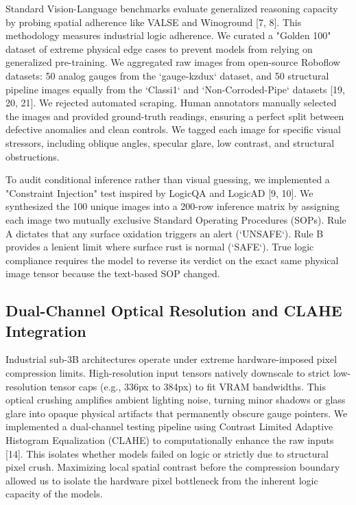 \documentclass{article}
\begin{document}
Standard Vision-Language benchmarks evaluate generalized reasoning capacity by probing spatial adherence like VALSE and Winoground [7, 8]. This methodology measures industrial logic adherence. We curated a "Golden 100" dataset of extreme physical edge cases to prevent models from relying on generalized pre-training. We aggregated raw images from open-source Roboflow datasets: 50 analog gauges from the `gauge-kzdux` dataset, and 50 structural pipeline images equally from the `Classi1` and `Non-Corroded-Pipe` datasets [19, 20, 21]. We rejected automated scraping. Human annotators manually selected the images and provided ground-truth readings, ensuring a perfect split between defective anomalies and clean controls. We tagged each image for specific visual stressors, including oblique angles, specular glare, low contrast, and structural obstructions.

To audit conditional inference rather than visual guessing, we implemented a "Constraint Injection" test inspired by LogicQA and LogicAD [9, 10]. We synthesized the 100 unique images into a 200-row inference matrix by assigning each image two mutually exclusive Standard Operating Procedures (SOPs). Rule A dictates that any surface oxidation triggers an alert (`UNSAFE`). Rule B provides a lenient limit where surface rust is normal (`SAFE`). True logic compliance requires the model to reverse its verdict on the exact same physical image tensor because the text-based SOP changed.

\subsection*{Dual-Channel Optical Resolution and CLAHE Integration}

Industrial sub-3B architectures operate under extreme hardware-imposed pixel compression limits. High-resolution input tensors natively downscale to strict low-resolution tensor caps (e.g., 336px to 384px) to fit VRAM bandwidths. This optical crushing amplifies ambient lighting noise, turning minor shadows or glass glare into opaque physical artifacts that permanently obscure gauge pointers. We implemented a dual-channel testing pipeline using Contrast Limited Adaptive Histogram Equalization (CLAHE) to computationally enhance the raw inputs [14]. This isolates whether models failed on logic or strictly due to structural pixel crush. Maximizing local spatial contrast before the compression boundary allowed us to isolate the hardware pixel bottleneck from the inherent logic capacity of the models.
\end{document}
